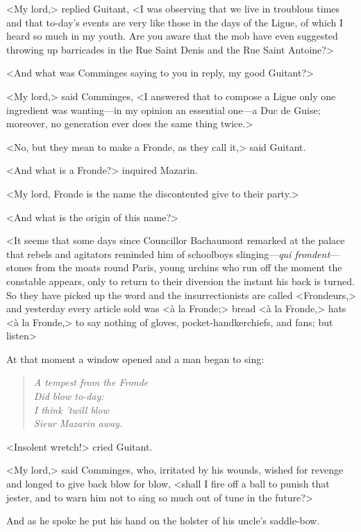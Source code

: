<My lord,> replied Guitant, <I was observing that we live in troublous times and that to-day's events are very like those in the days of the Ligue, of which I heard so much in my youth. Are you aware that the mob have even suggested throwing up barricades in the Rue Saint Denis and the Rue Saint Antoine?>

<And what was Comminges saying to you in reply, my good Guitant?>

<My lord,> said Comminges, <I answered that to compose a Ligue only one ingredient was wanting—in my opinion an essential one—a Duc de Guise; moreover, no generation ever does the same thing twice.>

<No, but they mean to make a Fronde, as they call it,> said Guitant.

<And what is a Fronde?> inquired Mazarin.

<My lord, Fronde is the name the discontented give to their party.>

<And what is the origin of this name?>

<It seems that some days since Councillor Bachaumont remarked at the palace that rebels and agitators reminded him of schoolboys slinging—\textit{qui frondent}—stones from the moats round Paris, young urchins who run off the moment the constable appears, only to return to their diversion the instant his back is turned. So they have picked up the word and the insurrectionists are called <Frondeurs,> and yesterday every article sold was <à la Fronde;> bread <à la Fronde,> hats <à la Fronde,> to say nothing of gloves, pocket-handkerchiefs, and fans; but listen\longdash>

At that moment a window opened and a man began to sing:  
\begin{verse}
	\begin{altverse}\itshape
	A tempest from the Fronde\\
	Did blow to-day:\\
	I think 'twill blow\\
	Sieur Mazarin away.
	\end{altverse}
	\end{verse}

<Insolent wretch!> cried Guitant.

<My lord,> said Comminges, who, irritated by his wounds, wished for revenge and longed to give back blow for blow, <shall I fire off a ball to punish that jester, and to warn him not to sing so much out of tune in the future?>

And as he spoke he put his hand on the holster of his uncle's saddle-bow.

